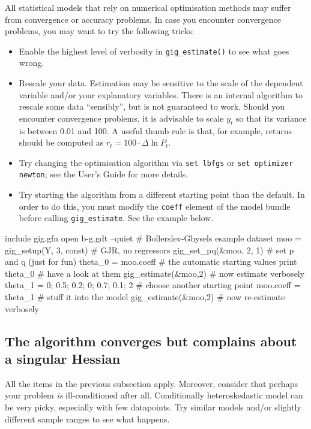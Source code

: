 \documentclass[a4paper,11pt]{article}
\begin{document}
All statistical models that rely on numerical optimisation methods may
suffer from convergence or accuracy problems. In case you encounter
convergence problems, you may want to try the following tricks:
\begin{itemize}
\item Enable the highest level of verbosity in
  \texttt{gig\_estimate()} to see what goes wrong.
\item Rescale your data. Estimation may be sensitive to the scale of
  the dependent variable and/or your explanatory variables. There is
  an internal algorithm to rescale some data ``sensibly'', but is not
  guaranteed to work. Should you encounter convergence problems, it is
  advisable to scale $y_t$ so that its variance is between 0.01 and
  100. A useful thumb rule is that, for example, returns should be
  computed as $r_t = 100 \cdot \Delta \ln P_t$.
\item Try changing the optimisation algorithm via \texttt{set lbfgs}
  or \texttt{set optimizer newton}; see the User's Guide for more details.
\item Try starting the algorithm from a different starting point than
  the default. In order to do this, you must modify the \texttt{coeff}
  element of the model bundle before calling
  \texttt{gig\_estimate}. See the example below.
\end{itemize}


\begin{scode}
include gig.gfn
open b-g.gdt --quiet                    # Bollerslev-Ghysels esample dataset
moo = gig_setup(Y, 3, const)            # GJR, no regressors
gig_set_pq(&moo, 2, 1)                  # set p and q (just for fun)
theta_0 = moo.coeff                     # the automatic starting values
print theta_0                           # have a look at them
gig_estimate(&moo,2)                    # now estimate verbosely
theta_1 = {0; 0.5; 0.2; 0; 0.7; 0.1; 2} # choose another starting point
moo.coeff = theta_1                     # stuff it into the model
gig_estimate(&moo,2)                    # now re-estimate verbosely
\end{scode}

\subsection{The algorithm converges but complains about a singular
  Hessian}

All the items in the previous subsection apply. Moreover, consider
that perhaps your problem \emph{is} ill-conditioned after
all. Conditionally heteroskedastic model can be very picky, especially
with few datapoints. Try similar models and/or slightly different
sample ranges to see what happens.
\end{document}
